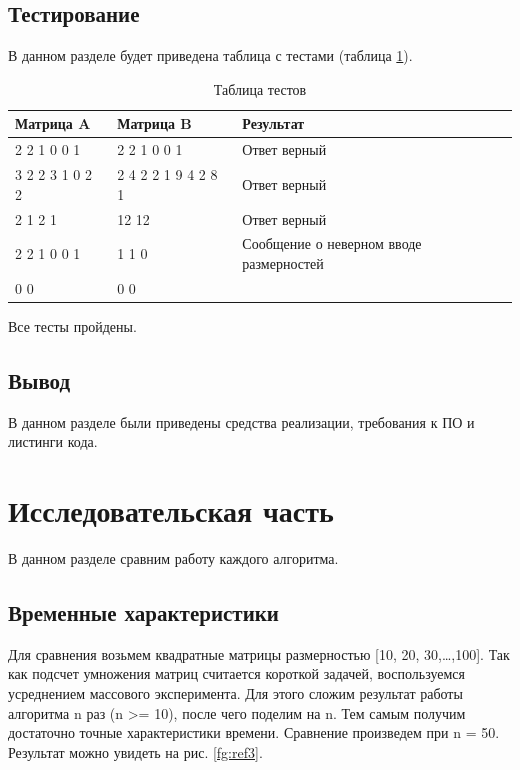 \documentclass[12pt,a4paper]{report}
\begin{document}
\section{Тестирование}

В данном разделе будет приведена таблица с тестами (таблица \ref{table:ref1}).

\begin{table}[ht]
	\centering
	\caption{Таблица тестов}
	\label{table:ref1}
	\begin{tabular}{ | l | l | l |}
		\hline
		Матрица A       & Матрица B           & Результат                               \\ \hline
		2 2 1 0 0 1     & 2 2 1 0 0 1         & Ответ верный                            \\ \hline
		3 2 2 3 1 0 2 2 & 2 4 2 2 1 9 4 2 8 1 & Ответ верный                            \\ \hline
		2 1 2 1         & 12 12               & Ответ верный                            \\ \hline
		2 2 1 0 0 1     & 1 1 0               & Сообщение о неверном вводе размерностей \\ \hline
		0 0             & 0 0                 &                                         \\ \hline
		\hline
	\end{tabular}
\end{table}

Все тесты пройдены.



\section*{Вывод}

В данном разделе были приведены средства реализации, требования к ПО и листинги кода.

\newpage
\chapter{Исследовательская часть} 

В данном разделе сравним работу каждого алгоритма.

\section{Временные характеристики}

Для сравнения возьмем квадратные матрицы размерностью [10, 20, 30,\dots,100]. 
Так как подсчет умножения матриц считается короткой задачей, воспользуемся усреднением массового эксперимента. 
Для этого сложим результат работы алгоритма n раз (n >= 10), после чего поделим на n. 
Тем самым получим достаточно точные характеристики времени. 
Сравнение произведем при n = 50.
Результат можно увидеть на рис. \ref{fg:ref3}. 
\end{document}
